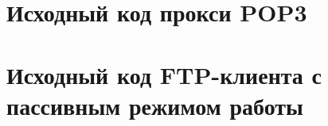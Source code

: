 \begin{append}

	\section{Исходный код прокси POP3} \label{app:pop}

	

	
	
	

	\section{Исходный код FTP-клиента с пассивным режимом работы} \label{app:ftp}

	

	

	

	

\end{append}
